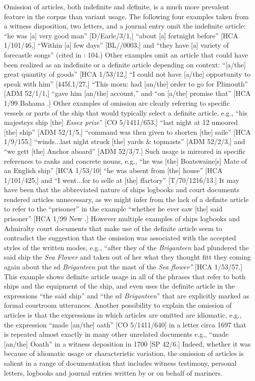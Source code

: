   Omission of articles, both indefinite and definite, is a much more prevalent feature in the corpus than variant usage. The following four examples taken from a witness disposition, two letters, and a journal entry omit the indefinite article: “he was [a] very good man” [D/Earle/3/1,] “about [a] fortnight before” [HCA 1/101/46,] “Within [a] few days” [BL/\citealt{Egerton2395}/0003,] and “they have [a] variety of forecastle songs” (cited in \citealt{Palmer1986}: 104.) Other examples omit an article that could have been realized as an indefinite or a definite article depending on context: “[a/the] great quantity of goods” [HCA 1/53/12,] “I could not have [a/the] opportunity to speak with him” [445f.1/27,] “This morn: had [an/the] order to go for Plimouth” [ADM 52/1/1,] “gave him [an/the] account,” and “on [a/the] promise that” [HCA 1/99 Bahama \citealt{Islands1722}.] Other examples of omission are clearly referring to specific vessels or parts of the ship that would typically select a definite article, e.g., “his majesteys ship [the] \textit{Essex prize}” [CO 5/1411/653,] “last night at 12 umoored [the] ship” [ADM 52/1/5,] “command was then given to shorten [the] saile” [HCA 1/9/155,] “winds...last night struck [the] yards \& topmasts” [ADM 52/2/3,] and “we gett [the] Anchor aboard” [ADM 52/3/7.] Such usage is mirrored in specific references to ranks and concrete nouns, e.g., “he was [the] Boatswaine[s] Mate of an English ship” [HCA 1/53/10] “he was absent from [the] house” [HCA 1/101/425,] and “I went...for to selle at [the] ffartory” [T/70/1216/13.] It may have been that the abbreviated nature of ships logbooks and court documents rendered articles unnecessary, as we might infer from the lack of a definite article to refer to the “prisoner” in the example “whether he ever saw [the] said prisoner” [HCA 1/99 New \citealt{Providence1722}.] However multiple examples of ships logbooks and Admiralty court documents that make use of the definite article seem to contradict the suggestion that the omission was associated with the accepted styles of the written modes, e.g., “after they of the \textit{Briganteen} had plundered the said ship the \textit{Sea Flower} and taken out of her what they thought fitt they coming again about the sd \textit{Briganteen} put the mast of the \textit{Sea flower”} [HCA 1/53/57.] This example shows definite article usage in all of the phrases that refer to both ships and the equipment of the ship, and even uses the definite article in the expressions “the said ship” and “the sd \textit{Briganteen}” that are explicitly marked as formal courtroom utterances. Another possibility to explain the omission of articles is that the expressions in which articles are omitted are idiomatic, e.g., the expression “made [an/the] oath” [CO 5/1411/640] in a letter circa 1697 that is repeated almost exactly in many other unrelated documents e.g., “made [an/the] Ooath” in a witness deposition in 1700 [SP 42/6.] Indeed, whether it was because of idiomatic usage or characteristic variation, the omission of articles is salient in a range of documentation that includes witness testimony, personal letters, logbooks and journal entries written by or on behalf of mariners. 

